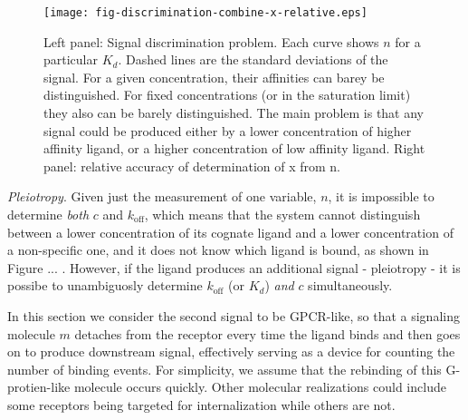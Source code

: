 \documentclass[prl,showpacs]{revtex4}
\begin{document}
\iffalse
\begin{figure}
    \texttt{[image: fig-discrimination-problem-dose-response.eps]}
     \texttt{[image: fig-x-relative-accuracy.eps]}
    \caption{Left panel: Signal discrimination problem. Each curve shows $n$ for a particular $K_d$. Dashed lines are the standard deviations of the signal. For a given concentration, their affinities can barey be distinguished. For fixed concentrations (or in the saturation limit) they also can be barely distinguished. The main problem is that any signal could be produced either by a lower concentration of higher affinity ligand, or a higher concentration of low affinity ligand. Right panel: relative accuracy of determination of x from n.}
\end{figure}
\fi

\begin{figure}
    \texttt{[image: fig-discrimination-combine-x-relative.eps]}
    \caption{Left panel: Signal discrimination problem. Each curve shows $n$ for a particular $K_d$. Dashed lines are the standard deviations of the signal. For a given concentration, their affinities can barey be distinguished. For fixed concentrations (or in the saturation limit) they also can be barely distinguished. The main problem is that any signal could be produced either by a lower concentration of higher affinity ligand, or a higher concentration of low affinity ligand. Right panel: relative accuracy of determination of x from n.}
\end{figure}

%
\emph{Pleiotropy}. Given just the measurement of one variable, $n$, it is impossible to determine \emph{both} $c$ and $k_{\text{off}}$, which means that the system cannot distinguish between a lower concentration of its cognate ligand and a lower concentration of a non-specific one, and it does not know which ligand is bound, as shown in Figure ... . However, if the ligand produces an additional signal - pleiotropy - it is possibe to unambiguosly determine $k_{\text{off}}$ (or $K_d$) \emph{and} $c$ simultaneously.

In this section we consider the second signal to be GPCR-like, so that a signaling molecule $m$ detaches from the receptor every time the ligand binds and then goes on to produce downstream signal, effectively serving as a device for counting the number of binding events. For simplicity, we assume that the rebinding of this G-protien-like molecule occurs quickly. Other molecular realizations could include some receptors being targeted for internalization while others are not. 
\end{document}
